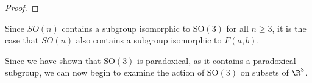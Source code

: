 \begin{proof}
\end{proof}
\begin{remark}
  Since $SO(n)$ contains a subgroup isomorphic to $\text{SO}(3)$ for all $n\geq 3$, it is the case that $SO(n)$ also contains a subgroup isomorphic to $F(a,b)$.
\end{remark}
Since we have shown that $\text{SO}(3)$ is paradoxical, as it contains a paradoxical subgroup, we can now begin to examine the action of $\text{SO}(3)$ on subsets of $\R^3$.
